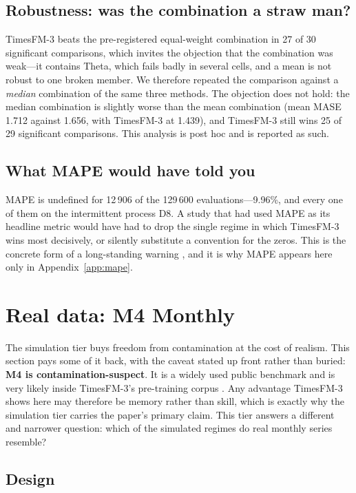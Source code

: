 \documentclass[article]{ajs}
\providecommand{\appendixref}[1]{Appendix~\ref{#1}}
\begin{document}
\subsection{Robustness: was the combination a straw man?}

TimesFM-3 beats the pre-registered equal-weight combination in 27 of 30 significant
comparisons, which invites the objection that the combination was weak---it contains Theta,
which fails badly in several cells, and a mean is not robust to one broken member. We therefore
repeated the comparison against a \emph{median} combination of the same three methods. The
objection does not hold: the median combination is slightly worse than the mean combination
(mean MASE 1.712 against 1.656, with TimesFM-3 at 1.439), and TimesFM-3 still wins 25 of 29
significant comparisons. This analysis is post hoc and is reported as such.

\subsection{What MAPE would have told you}

MAPE is undefined for 12\,906 of the 129\,600 evaluations---9.96\%, and every one of
them on the intermittent process D8. A study that had used MAPE as its headline metric would
have had to drop the single regime in which TimesFM-3 wins most decisively, or silently
substitute a convention for the zeros. This is the concrete form of a long-standing warning
\citep{hyndman2006mase, kolassa2016count}, and it is why MAPE appears here only in
\appendixref{app:mape}.

\section{Real data: M4 Monthly}
\label{sec:realdata}

The simulation tier buys freedom from contamination at the cost of realism. This section pays
some of it back, with the caveat stated up front rather than buried: \textbf{M4 is
contamination-suspect}. It is a widely used public benchmark and is very likely inside
TimesFM-3's pre-training corpus \citep{meyer2025leakage}. Any advantage TimesFM-3 shows here may
therefore be memory rather than skill, which is exactly why the simulation tier carries the
paper's primary claim. This tier answers a different and narrower question: which of the
simulated regimes do real monthly series resemble?

\subsection{Design}
\end{document}
